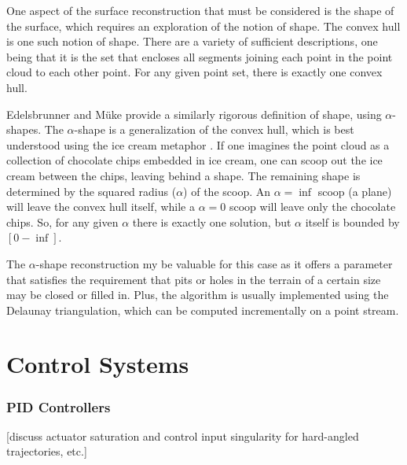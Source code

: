 One aspect of the surface reconstruction that must be considered is the shape of the surface, which requires an exploration of the notion of shape. The convex hull is one such notion of shape. There are a variety of sufficient descriptions, one being that it is the set that encloses all segments joining each point in the point cloud to each other point. For any given point set, there is exactly one convex hull.

Edelsbrunner and Müke \cite{Edelsbrunner1994}	provide a similarly rigorous definition of shape, using $\alpha$-shapes. The $\alpha$-shape is a generalization of the convex hull, which is best understood using the ice cream metaphor \cite{cgal:dy-as3-18b}. If one imagines the point cloud as a collection of chocolate chips embedded in ice cream, one can scoop out the ice cream between the chips, leaving behind a shape. The remaining shape is determined by the squared radius ($\alpha$) of the scoop. An $\alpha = \inf$ scoop (a plane) will leave the convex hull itself, while a $\alpha = 0$ scoop will leave only the chocolate chips. So, for any given $\alpha$ there is exactly one solution, but $\alpha$ itself is bounded by $[0-\inf]$.

The $\alpha$-shape reconstruction my be valuable for this case as it offers a parameter that satisfies the requirement that pits or holes in the terrain of a certain size may be closed or filled in. Plus, the algorithm is usually implemented using the Delaunay triangulation, which can be computed incrementally on a point stream.
\section{Control Systems}


\subsubsection{PID Controllers}

[discuss actuator saturation and control input singularity for hard-angled trajectories, etc.]


